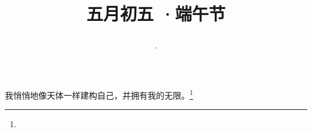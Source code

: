 \title{\date[d=10,m=6,y=2024][year:cn-y,年,month:cn,day:cn,日,·,weekday]·五月初五 ·端午节}
我悄悄地像天体一样建构自己，并拥有我的无限。\footnote{ }

